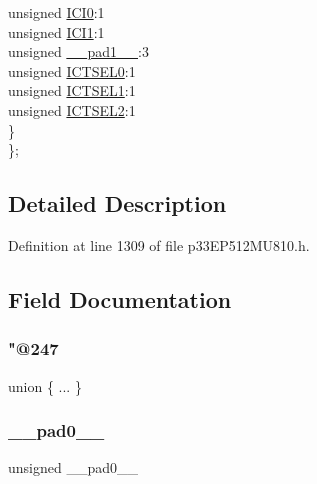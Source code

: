 \begin{DoxyCompactItemize}
\begin{tabbing}
\>\>unsigned \hyperlink{structtag_i_c15_c_o_n1_b_i_t_s_a6f1b5da2706b7c15fc8c9a01a30deaff}{ICI0}:1\\
\>\>unsigned \hyperlink{structtag_i_c15_c_o_n1_b_i_t_s_a7d5c777f0bc43f66f40462f79ed2179c}{ICI1}:1\\
\>\>unsigned \hyperlink{structtag_i_c15_c_o_n1_b_i_t_s_acaf2d0924a107ec6e8d2e31febaf66f9}{\_\_pad1\_\_}:3\\
\>\>unsigned \hyperlink{structtag_i_c15_c_o_n1_b_i_t_s_af6dd4d0e816b18462680d4b22fa926d3}{ICTSEL0}:1\\
\>\>unsigned \hyperlink{structtag_i_c15_c_o_n1_b_i_t_s_aa29140e739d886362537f87d199c4134}{ICTSEL1}:1\\
\>\>unsigned \hyperlink{structtag_i_c15_c_o_n1_b_i_t_s_a47d80892d449e6edbd5ba2ba9ff06deb}{ICTSEL2}:1\\
\>\} \\
\}; \\

\end{tabbing}\end{DoxyCompactItemize}


\subsection{Detailed Description}


Definition at line 1309 of file p33\+E\+P512\+M\+U810.\+h.



\subsection{Field Documentation}
\mbox{\label{structtag_i_c15_c_o_n1_b_i_t_s_a1f155ec9b2a394ec396735cad3e57b09}} 
\subsubsection{\texorpdfstring{"@247}{@247}}
{\footnotesize\ttfamily union \{ ... \} }

\mbox{\label{structtag_i_c15_c_o_n1_b_i_t_s_adf71f3d8410c1f1dbbc96680a92c49af}} 
\subsubsection{\texorpdfstring{\+\_\+\+\_\+pad0\+\_\+\+\_\+}{\_\_pad0\_\_}}
{\footnotesize\ttfamily unsigned \+\_\+\+\_\+pad0\+\_\+\+\_\+}




